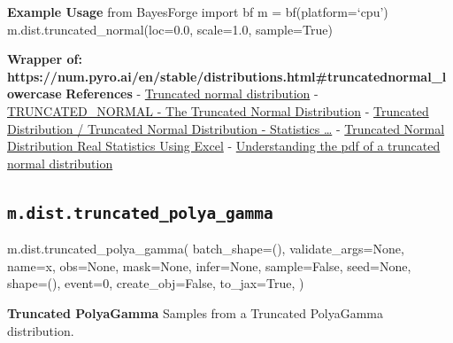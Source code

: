 \documentclass[
  letterpaper,
  DIV=11,
  numbers=noendperiod]{scrartcl}
\newenvironment{Shaded}{\begin{snugshade}}{\end{snugshade}}
\newcommand{\DecValTok}[1]{\textcolor[rgb]{0.68,0.00,0.00}{#1}}
\newcommand{\NormalTok}[1]{\textcolor[rgb]{0.00,0.23,0.31}{#1}}
\newcommand{\OperatorTok}[1]{\textcolor[rgb]{0.37,0.37,0.37}{#1}}
\newcommand{\StringTok}[1]{\textcolor[rgb]{0.13,0.47,0.30}{#1}}
\newcommand{\VariableTok}[1]{\textcolor[rgb]{0.07,0.07,0.07}{#1}}
\begin{document}
\textbf{Example Usage} from BayesForge import bf m = bf(platform=`cpu')
m.dist.truncated\_normal(loc=0.0, scale=1.0, sample=True)

\textbf{Wrapper of:
https://num.pyro.ai/en/stable/distributions.html\#truncatednormal\_lowercase}
\textbf{References} -
\href{https://en.wikipedia.org/wiki/Truncated_normal_distribution}{Truncated
normal distribution} -
\href{https://people.math.sc.edu/burkardt/m_src/truncated_normal/truncated_normal.html}{TRUNCATED\_NORMAL
- The Truncated Normal Distribution} -
\href{https://www.statisticshowto.com/truncated-normal-distribution/}{Truncated
Distribution / Truncated Normal Distribution - Statistics \ldots{}} -
\href{https://real-statistics.com/normal-distribution/truncated-normal-distribution/}{Truncated
Normal Distribution \textbar{} Real Statistics Using Excel} -
\href{https://stats.stackexchange.com/questions/525894/understanding-the-pdf-of-a-truncated-normal-distribution}{Understanding
the pdf of a truncated normal distribution}

\subsection{\texorpdfstring{\texttt{m.dist.truncated\_polya\_gamma}}{m.dist.truncated\_polya\_gamma}}\label{truncated_polya_gamma}

\begin{Shaded}
\begin{Highlighting}[]
\NormalTok{m.dist.truncated\_polya\_gamma(}
\NormalTok{    batch\_shape}\OperatorTok{=}\NormalTok{(),}
\NormalTok{    validate\_args}\OperatorTok{=}\VariableTok{None}\NormalTok{,}
\NormalTok{    name}\OperatorTok{=}\StringTok{\textquotesingle{}x\textquotesingle{}}\NormalTok{,}
\NormalTok{    obs}\OperatorTok{=}\VariableTok{None}\NormalTok{,}
\NormalTok{    mask}\OperatorTok{=}\VariableTok{None}\NormalTok{,}
\NormalTok{    infer}\OperatorTok{=}\VariableTok{None}\NormalTok{,}
\NormalTok{    sample}\OperatorTok{=}\VariableTok{False}\NormalTok{,}
\NormalTok{    seed}\OperatorTok{=}\VariableTok{None}\NormalTok{,}
\NormalTok{    shape}\OperatorTok{=}\NormalTok{(),}
\NormalTok{    event}\OperatorTok{=}\DecValTok{0}\NormalTok{,}
\NormalTok{    create\_obj}\OperatorTok{=}\VariableTok{False}\NormalTok{,}
\NormalTok{    to\_jax}\OperatorTok{=}\VariableTok{True}\NormalTok{,}
\NormalTok{)}
\end{Highlighting}
\end{Shaded}

\textbf{Truncated PolyaGamma} Samples from a Truncated PolyaGamma
distribution.
\end{document}
